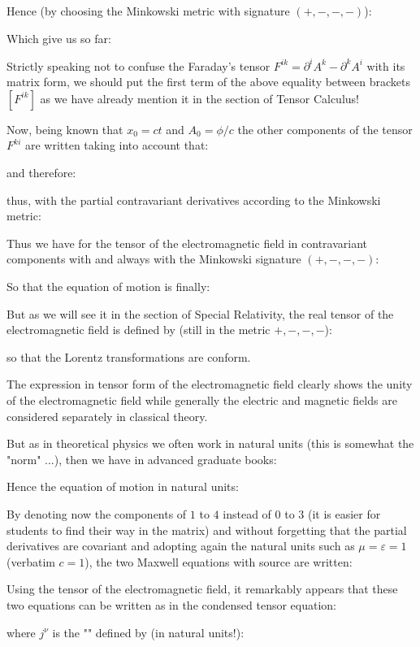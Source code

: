 	Hence (by choosing the Minkowski metric with signature $(+, -, -, -)$):
	
	Which give us so far:
	
	\begin{tcolorbox}[title=Remark,colframe=black,arc=10pt]
	Strictly speaking not to confuse the Faraday's tensor $F^{ik}=\partial^iA^k-\partial^kA^i$ with its matrix form, we should put the first term of the above equality between brackets $[F^{ik}]$ as we have already mention it in the section of Tensor Calculus!
	\end{tcolorbox}
	Now, being known that $x_0=ct$ and $A_0=\phi/c$ the other components of the tensor $F^{ki}$ are written taking into account that:
	
	and therefore:
	
	thus, with the partial contravariant  derivatives according to the Minkowski metric:
	
	Thus we have for the tensor of the electromagnetic field in contravariant components with and always with the Minkowski signature $(+, -, -, -)$:
	
	So that the equation of motion is finally:
	
	But as we will see it in the section of Special Relativity, the real tensor of the electromagnetic field is defined by (still in the metric $+, -, -, -$):	
	
	so that the Lorentz transformations are conform.

	The expression in tensor form of the electromagnetic field clearly shows the unity of the electromagnetic field while generally the electric and magnetic fields are considered separately in classical theory.

	But as in theoretical physics we often work in natural units (this is somewhat the "norm" ...), then we have in advanced graduate books:
	
	Hence the equation of motion in natural units:
	
	By denoting now the components of $1$ to $4$ instead of $0$ to $3$ (it is easier for students to find their way in the matrix) and without forgetting that the partial derivatives are covariant and adopting again the natural units such as $\mu=\varepsilon=1$ (verbatim $c=1$), the two Maxwell equations with source are written:
	
	Using the tensor of the electromagnetic field, it remarkably appears that these two equations can be written as in the condensed tensor equation:
	
	where $j^\nu$ is the "\label{four vector current}" defined by (in natural units!):
	
